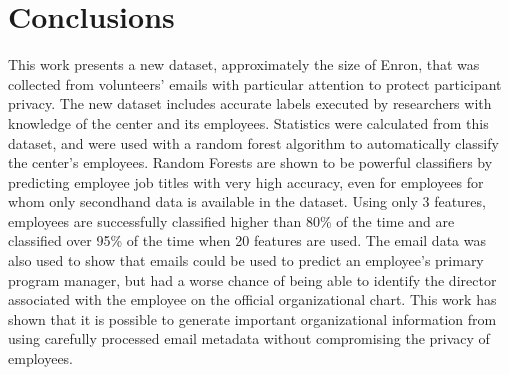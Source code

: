 \documentclass[12pt]{report}
\begin{document}
\chapter{Conclusions} \label{Conclusions}
This work presents a new dataset, approximately the size of Enron, that was collected from volunteers' emails with particular attention to protect participant privacy.
The new dataset includes accurate labels executed by researchers with knowledge of the center and its employees.
Statistics were calculated from this dataset, and were used with a random forest algorithm to automatically classify the center's employees.
Random Forests are shown to be powerful classifiers by predicting employee job titles with very high accuracy, even for employees for whom only secondhand data is available in the dataset.
Using only 3 features, employees are successfully classified higher than 80\% of the time and are classified over 95\% of the time when 20 features are used.
The email data was also used to show that emails could be used to predict an employee's primary program manager, but had a worse chance of being able to identify the director associated with the employee on the official organizational chart.
This work has shown that it is possible to generate important organizational information from using carefully processed email metadata without compromising the privacy of employees.


%
%

%







\end{document}
